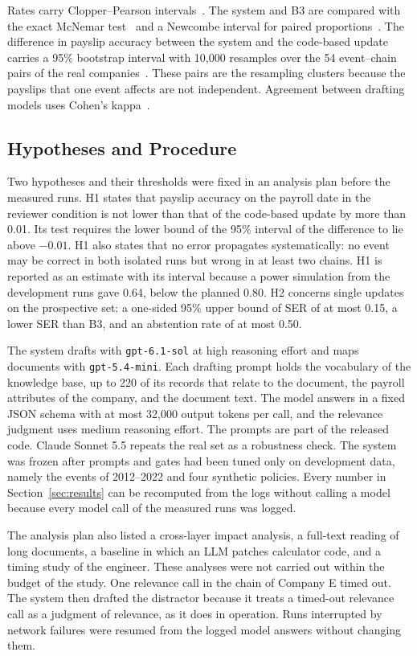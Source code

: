 Rates carry Clopper--Pearson intervals~\cite{clopper1934use}. The system and B3 are compared with the exact McNemar test~\cite{mcnemar1947note} and a Newcombe interval for paired proportions~\cite{newcombe1998improved}. The difference in payslip accuracy between the system and the code-based update carries a 95\% bootstrap interval with 10,000 resamples over the 54 event--chain pairs of the real companies~\cite{field2007bootstrapping}. These pairs are the resampling clusters because the payslips that one event affects are not independent. Agreement between drafting models uses Cohen's kappa~\cite{cohen1960coefficient}.

\subsection{Hypotheses and Procedure}
Two hypotheses and their thresholds were fixed in an analysis plan before the measured runs. H1 states that payslip accuracy on the payroll date in the reviewer condition is not lower than that of the code-based update by more than 0.01. Its test requires the lower bound of the 95\% interval of the difference to lie above $-0.01$. H1 also states that no error propagates systematically: no event may be correct in both isolated runs but wrong in at least two chains. H1 is reported as an estimate with its interval because a power simulation from the development runs gave 0.64, below the planned 0.80. H2 concerns single updates on the prospective set: a one-sided 95\% upper bound of SER of at most 0.15, a lower SER than B3, and an abstention rate of at most 0.50.

The system drafts with \texttt{gpt-6.1-sol} at high reasoning effort and maps documents with \texttt{gpt-5.4-mini}. Each drafting prompt holds the vocabulary of the knowledge base, up to 220 of its records that relate to the document, the payroll attributes of the company, and the document text. The model answers in a fixed JSON schema with at most 32,000 output tokens per call, and the relevance judgment uses medium reasoning effort. The prompts are part of the released code. Claude Sonnet 5.5 repeats the real set as a robustness check. The system was frozen after prompts and gates had been tuned only on development data, namely the events of 2012--2022 and four synthetic policies. Every number in Section~\ref{sec:results} can be recomputed from the logs without calling a model because every model call of the measured runs was logged.

The analysis plan also listed a cross-layer impact analysis, a full-text reading of long documents, a baseline in which an LLM patches calculator code, and a timing study of the engineer. These analyses were not carried out within the budget of the study. One relevance call in the chain of Company E timed out. The system then drafted the distractor because it treats a timed-out relevance call as a judgment of relevance, as it does in operation. Runs interrupted by network failures were resumed from the logged model answers without changing them.
